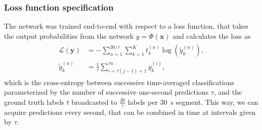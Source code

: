 \subsubsection{Loss function specification}
The network was trained end-to-end with respect to a loss function, that takes the output probabilities from the network $y = \Phi\left( \mathbf{x} \right)$ and calculates the loss as
\begin{align}
\begin{split}\label{eq:loss-paperII}
    \mathcal{L}\left( \mathbf{y} \right) &= - \sum_{n=1}^{30/\tau}\sum_{k=1}^{K} t_k^{(n)}\log{\left( \tilde{y}^{(n)}_k \right)}, \\
    \tilde{y}^{(n)}_k &= \frac{1}{\tau} \sum_{i=\tau \left( j - 1 \right) + 1}^{\tau n} y_k^{(i)},
\end{split}
\end{align}
which is the cross-entropy between successive time-averaged classifications parameterized by the number of successive one-second predictions $\tau$, and the ground truth labels $t$ broadcasted to $\frac{30}{\tau}$ labels per \SI{30}{\second} segment.
This way, we can acquire predictions every second, that can be combined in time at intervals given by $\tau$.

